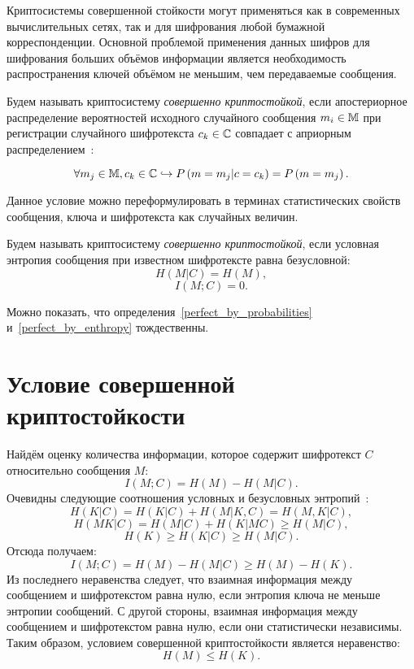 Криптосистемы совершенной стойкости могут применяться как в современных вычислительных сетях, так и для шифрования любой бумажной корреспонденции. Основной проблемой применения данных шифров для шифрования больших объёмов информации является необходимость распространения ключей объёмом не меньшим, чем передаваемые сообщения.

\begin{definition}\label{perfect_by_probabilities}
Будем называть криптосистему \emph{совершенно криптостойкой}, если апостериорное распределение вероятностей исходного случайного сообщения $m_i \in \mathbb{M}$ при регистрации случайного шифротекста $c_k \in \mathbb{C}$ совпадает с априорным распределением~\cite{Gultyaeva:2010}:

	\[\forall m_j \in \mathbb{M}, c_k \in \mathbb{C} \hookrightarrow P \left( m = m_j | c = c_k \right) = P \left( m = m_j \right).\]
\end{definition}

Данное условие можно переформулировать в терминах статистических свойств сообщения, ключа и шифротекста как случайных величин.

\begin{definition}\label{perfect_by_enthropy}
Будем называть криптосистему \emph{совершенно криптостойкой}, если условная энтропия сообщения при известном шифротексте равна безусловной:
	\[H \left( M | C \right) = H \left( M \right),\]
	\[I \left( M; C \right) = 0.\]
\end{definition}

Можно показать, что определения~\ref{perfect_by_probabilities} и~\ref{perfect_by_enthropy} тождественны.

\section[Условие]{Условие совершенной криптостойкости}

Найдём оценку количества информации, которое содержит шифротекст $C$ относительно сообщения $M$:
\[ I(M; C) = H(M) - H(M | C). \]
Очевидны следующие соотношения условных и безусловных энтропий~\cite{GabPil:2007}:
\[H(K|C)=H(K|C)+H(M|K,C)=H(M,K|C),\]
\[H(MK|C)=H(M|C)+H(K|MC)\geq H(M|C),\]
\[H(K)\geq H(K|C)\geq H(M|C).\]
Отсюда получаем:
 \[ I(M; C) = H(M) - H(M | C)\geq H(M)-H(K). \]
Из последнего неравенства следует, что взаимная информация между сообщением и шифротекстом равна нулю, если энтропия ключа не меньше энтропии сообщений. С другой стороны, взаимная информация между сообщением и шифротекстом равна нулю, если они статистически независимы. Таким образом, условием совершенной криптостойкости является неравенство:
\[ H(M) \leq H(K).\]

